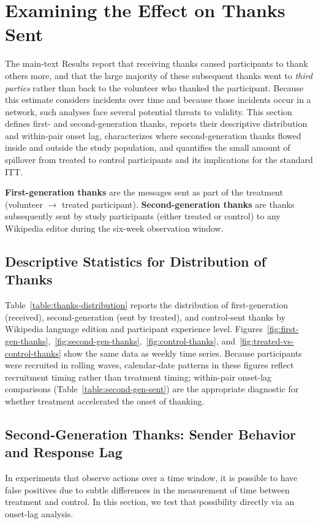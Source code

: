 \documentclass[9pt,twoside,lineno]{pnas-new}
\begin{document}
%
\section*{Examining the Effect on Thanks Sent}
The main-text Results report that receiving thanks caused participants to thank others more, and that the large majority of these subsequent thanks went to \emph{third parties} rather than back to the volunteer who thanked the participant. Because this estimate considers incidents over time and because those incidents occur in a network, such analyses face several potential threats to validity. This section defines first- and second-generation thanks, reports their descriptive distribution and within-pair onset lag, characterizes where second-generation thanks flowed inside and outside the study population, and quantifies the small amount of spillover from treated to control participants and its implications for the standard ITT.

\textbf{First-generation thanks} are the messages sent as part of the treatment (volunteer $\to$ treated participant). \textbf{Second-generation thanks} are thanks subsequently sent by study participants (either treated or control) to any Wikipedia editor during the six-week observation window.

\subsection*{Descriptive Statistics for Distribution of Thanks}
Table~\ref{table:thanks-distribution} reports the distribution of first-generation (received), second-generation (sent by treated), and control-sent thanks by Wikipedia language edition and participant experience level. Figures~\ref{fig:first-gen-thanks},~\ref{fig:second-gen-thanks},~\ref{fig:control-thanks}, and~\ref{fig:treated-vs-control-thanks} show the same data as weekly time series. Because participants were recruited in rolling waves, calendar-date patterns in these figures reflect recruitment timing rather than treatment timing; within-pair onset-lag comparisons (Table~\ref{table:second-gen-sent}) are the appropriate diagnostic for whether treatment accelerated the onset of thanking.



\subsection*{Second-Generation Thanks: Sender Behavior and Response Lag}
In experiments that observe actions over a time window, it is possible to have false positives due to subtle differences in the measurement of time between treatment and control. In this section, we test that possibility directly via an onset-lag analysis.
\end{document}
